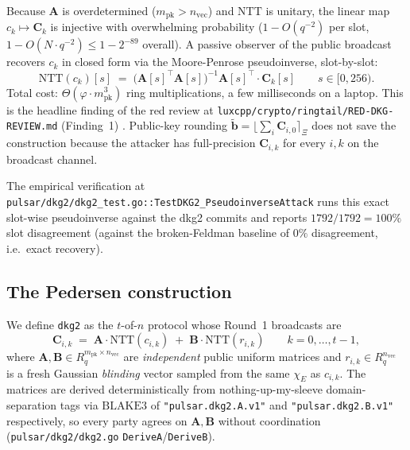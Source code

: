 Because $\mathbf{A}$ is overdetermined ($m_{\textrm{pk}} > n_{\textrm{vec}}$)
and $\mathrm{NTT}$ is unitary, the linear map $c_k \mapsto \mathbf{C}_k$
is injective with overwhelming probability ($1 - O(q^{-2})$ per slot,
$1 - O(N \cdot q^{-2}) \le 1 - 2^{-89}$ overall). A passive observer of
the public broadcast recovers $c_k$ in closed form via the Moore-Penrose
pseudoinverse, slot-by-slot:
\begin{equation}
\label{eq:pseudoinverse-attack}
\mathrm{NTT}(c_k)[s]
\;=\; \bigl(\mathbf{A}[s]^{\top}\mathbf{A}[s]\bigr)^{-1}
       \mathbf{A}[s]^{\top}\cdot\mathbf{C}_k[s]
\qquad s\in[0,256).
\end{equation}
Total cost: $\Theta(\varphi\cdot m_{\textrm{pk}}^3)$ ring multiplications,
a few milliseconds on a laptop. This is the headline finding of the red
review at
\texttt{luxcpp/crypto/ringtail/RED-DKG-REVIEW.md} (Finding~1)
\cite{red-dkg-review}. Public-key rounding
$\tilde{\mathbf{b}} = \lfloor\sum_i \mathbf{C}_{i,0}\rceil_\Xi$ does not
save the construction because the attacker has full-precision
$\mathbf{C}_{i,k}$ for every $i,k$ on the broadcast channel.

The empirical verification at
\texttt{pulsar/dkg2/dkg2\_test.go::TestDKG2\_PseudoinverseAttack} runs
this exact slot-wise pseudoinverse against the dkg2 commits and reports
$1792/1792 = 100\%$ slot disagreement (against the broken-Feldman
baseline of $0\%$ disagreement, i.e.\ exact recovery).

\subsection{The Pedersen construction}
\label{ssec:pedersen-construction}

We define \texttt{dkg2} as the $t$-of-$n$ protocol whose Round~1
broadcasts are
\begin{equation}
\label{eq:pedersen-commit}
\mathbf{C}_{i,k} \;=\; \mathbf{A}\cdot\mathrm{NTT}(c_{i,k}) \;+\; \mathbf{B}\cdot\mathrm{NTT}(r_{i,k})
\qquad k=0,\dots,t-1,
\end{equation}
where $\mathbf{A}, \mathbf{B} \in R_q^{m_{\textrm{pk}} \times n_{\textrm{vec}}}$
are \emph{independent} public uniform matrices and
$r_{i,k} \in R_q^{n_{\textrm{vec}}}$ is a fresh Gaussian \emph{blinding}
vector sampled from the same $\chi_E$ as $c_{i,k}$. The matrices are
derived deterministically from nothing-up-my-sleeve domain-separation
tags via $\mathrm{BLAKE3}$ of \texttt{"pulsar.dkg2.A.v1"} and
\texttt{"pulsar.dkg2.B.v1"} respectively, so every party agrees on
$\mathbf{A}, \mathbf{B}$ without coordination
(\texttt{pulsar/dkg2/dkg2.go} \texttt{DeriveA}/\texttt{DeriveB}).

